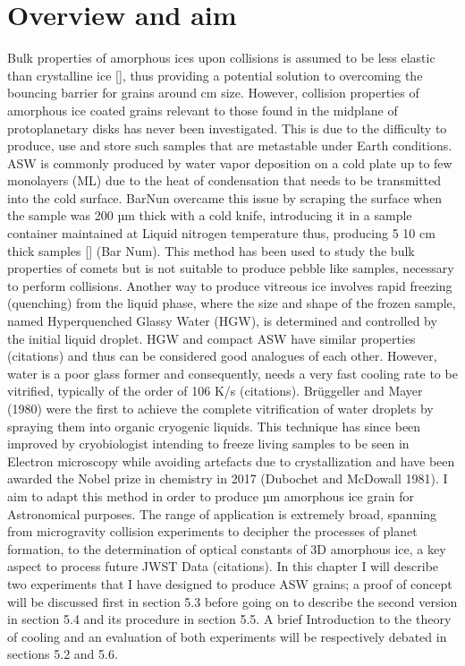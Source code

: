\documentclass[letterpaper,10pt,english]{jupyterBook}
\begin{document}
\section{Overview and aim}
\label{\detokenize{Chapter6/Chapter6:overview-and-aim}}
\sphinxAtStartPar
Bulk properties of amorphous ices upon collisions is assumed to be less elastic than crystalline ice {[}{]}, thus providing a potential solution to overcoming the bouncing barrier for grains around cm size. However, collision properties of amorphous ice coated grains relevant to those found in the midplane of protoplanetary disks has never been investigated. This is due to the difficulty to produce, use and store such samples that are metastable under Earth conditions.
ASW is commonly produced by water vapor deposition on a cold plate up to few monolayers (ML) due to the heat of condensation that needs to be transmitted into the cold surface. Bar\sphinxhyphen{}Nun overcame this issue by scraping the surface when the sample was 200 µm thick with a cold knife, introducing it in a sample container maintained at Liquid nitrogen temperature thus, producing 5\sphinxhyphen{} 10 cm thick samples {[}{]} (Bar Num). This method has been used to study the bulk properties of comets but is not suitable to produce pebble like samples, necessary to perform collisions.
Another way to produce vitreous ice involves rapid freezing (quenching) from the liquid phase, where the size and shape of the frozen sample, named Hyperquenched Glassy Water (HGW), is determined and controlled by the initial liquid droplet. HGW and compact ASW have similar properties (citations) and thus can be considered good analogues of each other. However, water is a poor glass former and consequently, needs a very fast cooling rate to be vitrified, typically of the order of 106 K/s (citations).
Brüggeller and Mayer (1980) were the first to achieve the complete vitrification of water droplets by spraying them into organic cryogenic liquids. This technique has since been improved by cryo\sphinxhyphen{}biologist intending to freeze living samples to be seen in Electron microscopy while avoiding artefacts due to crystallization and have been awarded the Nobel prize in chemistry in 2017 (Dubochet and McDowall 1981).
I aim to adapt this method in order to produce µm amorphous ice grain for Astronomical purposes. The range of application is extremely broad, spanning from microgravity collision experiments to decipher the processes of planet formation, to the determination of optical constants of 3D amorphous ice, a key aspect to process future JWST Data (citations).
In this chapter I will describe two experiments that I have designed to produce ASW grains; a proof of concept will be discussed first in section 5.3 before going on to describe the second version in section 5.4 and its procedure in section 5.5. A brief Introduction to the theory of cooling and an evaluation of both experiments will be respectively debated in sections 5.2 and 5.6.
\end{document}
